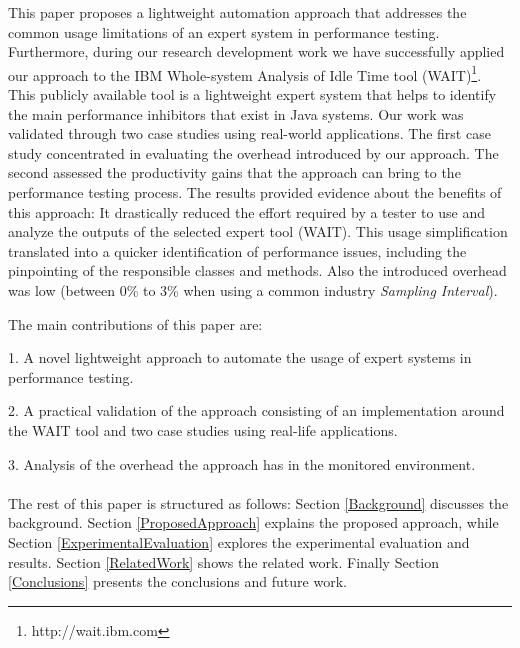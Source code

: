 \documentclass[runningheads,a4paper]{llncs}
\begin{document}
This paper proposes a lightweight automation approach that addresses the common
usage limitations of an expert system in performance testing. Furthermore,
during our research development work we have successfully applied our approach
to the IBM Whole-system Analysis of Idle Time tool (WAIT)\footnote{http://wait.ibm.com}. 
This publicly available tool is a lightweight expert system that helps to
identify the main performance inhibitors that exist in Java systems. Our work was 
validated through two case studies using real-world applications. The first case study 
concentrated in evaluating the overhead introduced by our approach. The second
assessed the productivity gains that the approach can bring to the
performance testing process. The results provided evidence about
the benefits of this approach: It drastically reduced the effort required by a
tester to use and analyze the outputs of the selected expert tool (WAIT). This
usage simplification translated into a quicker identification of performance issues, 
including the pinpointing of the responsible classes and methods. Also the
introduced overhead was low (between 0\% to 3\% when using a common industry
\emph{Sampling Interval}).

The main contributions of this paper are: 

1. A novel lightweight approach to automate the usage of expert systems in
performance testing.

2. A practical validation of the approach consisting of an implementation
around the WAIT tool and two case studies using real-life applications.

3. Analysis of the overhead the approach has in the monitored environment.
\\\\
The rest of this paper is structured as follows: Section \ref{Background}
discusses the background. Section \ref{ProposedApproach} explains the proposed
approach, while Section \ref{ExperimentalEvaluation} explores the experimental 
evaluation and results. Section \ref{RelatedWork} shows the related work.
Finally Section \ref{Conclusions} presents the conclusions and future work.


\vspace{-7pt}
\end{document}
